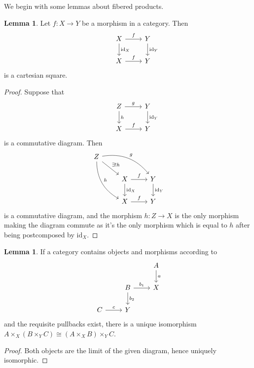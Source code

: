 \documentclass{article}
\theoremstyle{definition}
\newtheorem{lemma}[theorem]{Lemma}
\newcommand{\id}{\text{id}}
\begin{document}
We begin with some lemmas about fibered products.

\begin{lemma}
	Let $f : X \to Y$ be a morphism in a category. Then
	\[
		\begin{tikzcd}
			& X
			\ar[r, "f"]
			\ar[d, "\id_X"]
			& Y
			\ar[d, "\id_Y"] \\
			& X
			\ar[r, "f"]
			& Y
		\end{tikzcd}
	\]
	is a cartesian square.
\end{lemma}
\begin{proof}
	Suppose that
	\[
		\begin{tikzcd}
			& Z
			\ar[r, "g"]
			\ar[d, "h"]
			& Y
			\ar[d, "\id_Y"] \\
			& X
			\ar[r, "f"]
			& Y
		\end{tikzcd}
	\]
	is a commutative diagram. Then
	\[
		\begin{tikzcd}
			Z
			\ar[rd, "\exists! h"]
			\ar[rrd, bend left=30, "g"]
			\ar[rdd, bend right=30, "h"]
			\\
			& X
			\ar[r, "f"]
			\ar[d, "\id_X"]
			& Y
			\ar[d, "\id_Y"] \\
			& X
			\ar[r, "f"]
			& Y
		\end{tikzcd}
	\]
	is a commutative diagram, and the morphism $h : Z \to X$ is the only morphism making the
	diagram commute as it's the only morphism which is equal to $h$ after being postcomposed by
	$\id_X$.
\end{proof}

\begin{lemma}
	If a category contains objects and morphisms according to
	\[
		\begin{tikzcd}
			&
			&
			A
			\ar[d, "a"] \\
			&
			B
			\ar[r, "b_{1}"]
			\ar[d, "b_{2}"]
			& X \\
			C
			\ar[r, "c"]
			& Y
		\end{tikzcd}
	\]
	and the requisite pullbacks exist, there is a unique isomorphism $A
		\times_X (B \times_Y C) \cong (A \times_X B) \times_Y C$.
\end{lemma}
\begin{proof}
	Both objects are the limit of the given diagram, hence uniquely isomorphic.
\end{proof}
\end{document}
